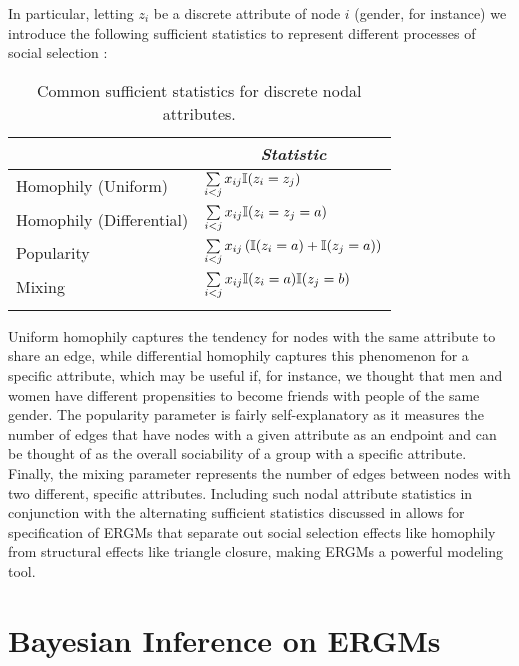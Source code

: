 In particular, letting $z_i$ be a discrete attribute of node $i$ (gender, for instance) we introduce the following sufficient statistics to represent different processes of social selection \cite{LKR12}:

\begin{table}[H]
	\caption{Common sufficient statistics for discrete nodal attributes.}
	\label{table:node_suff_stats_defn}
	\begin{center}
	\begin{tabular}[!h]{ll}
	\hhline{=|=}
	\multicolumn{1}{c}{\emph{Parameter}} &  \multicolumn{1}{c}{\emph{Statistic}}  \\ \midrule
	Homophily (Uniform)  & $\sum\limits_{i < j} x_{ij} \mathbb{I} (z_i = z_j) $ \\\midrule
	Homophily (Differential)  & $\sum\limits_{i < j} x_{ij} \mathbb{I} (z_i = z_j = a) $ \\\midrule
	Popularity &  $\sum\limits_{i < j} x_{ij} \left(\mathbb{I} (z_i = a) + \mathbb{I} (z_j = a) \right) $ \\ \midrule
	Mixing & $\sum\limits_{i < j} x_{ij} \mathbb{I} (z_i = a) \mathbb{I} (z_j = b)$  \\
	\hhline{=|=}
	\end{tabular}
	\end{center}
\end{table}

Uniform homophily captures the tendency for nodes with the same attribute to share an edge, while differential homophily captures this phenomenon for a specific attribute, which may be useful if, for instance, we thought that men and women have different propensities to become friends with people of the same gender. The popularity parameter is fairly self-explanatory as it measures the number of edges that have nodes with a given attribute as an endpoint and can be thought of as the overall sociability of a group with a specific attribute. Finally, the mixing parameter represents the number of edges between nodes with two different, specific attributes. Including such nodal attribute statistics in conjunction with the alternating sufficient statistics discussed in  allows for specification of ERGMs that separate out social selection effects like homophily from structural effects like triangle closure, making ERGMs a powerful modeling tool.

\section{Bayesian Inference on ERGMs}\label{sec:bayes_inf}


